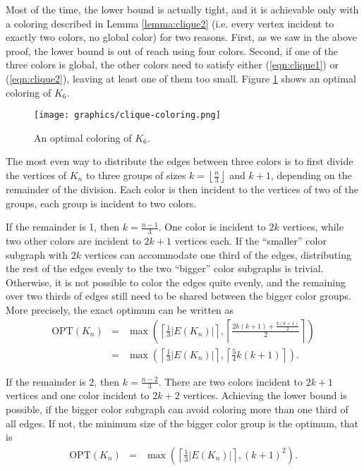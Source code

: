 \documentclass[runningheads, a4paper]{llncs}
\begin{document}
Most of the time, the lower bound is actually tight, and it is achievable only with a coloring described in Lemma \ref{lemma:clique2} (i.e. every vertex incident to exactly two colors, no global color) for two reasons. First, as we saw in the above proof, the lower bound is out of reach using four colors. Second, if one of the three colors is global, the other colors need to satisfy either (\ref{eqn:clique1}) or (\ref{eqn:clique2}), leaving at least one of them too small. Figure \ref{img:clique-coloring} shows an optimal coloring of $K_6$.

\begin{figure}[htb]
\centering \texttt{[image: graphics/clique-coloring.png]}
\caption{An optimal coloring of $K_6$.}\label{img:clique-coloring}
\end{figure}

The most even way to distribute the edges between three colors is to first divide the vertices of $K_n$ to three groups of sizes $k = \left\lfloor \frac{n}{3} \right\rfloor$ and $k + 1$, depending on the remainder of the division. Each color is then incident to the vertices of two of the groups, each group is incident to two colors.

If the remainder is 1, then $k = \frac{n-1}{3}$. One color is incident to $2k$ vertices, while two other colors are incident to $2k + 1$ vertices each. If the ``smaller'' color subgraph with $2k$ vertices can accommodate one third of the edges, distributing the rest of the edges evenly to the two ``bigger'' color subgraphs is trivial. Otherwise, it is not possible to color the edges quite evenly, and the remaining over two thirds of edges still need to be shared between the bigger color groups. More precisely, the exact optimum can be written as
\begin{eqnarray}\nonumber
\textrm{OPT}(K_n) & = & \max \left( \left\lceil \frac{1}{3} |E(K_n)| \right\rceil, \left\lceil \frac{2 k(k+1) + \frac{k(k+1)}{2}}{2} \right\rceil \right) \\ \nonumber
& = & \max \left( \left\lceil \frac{1}{3} |E(K_n)| \right\rceil, \left\lceil \frac{5}{4}k(k+1) \right\rceil \right).
\end{eqnarray}

If the remainder is 2, then $k = \frac{n-2}{3}$. There are two colors incident to $2k + 1$ vertices and one color incident to $2k + 2$ vertices. Achieving the lower bound is possible, if the bigger color subgraph can avoid coloring more than one third of all edges. If not, the minimum size of the bigger color group is the optimum, that is
\begin{eqnarray}\nonumber
\textrm{OPT}(K_n) & = & \max \left( \left\lceil \frac{1}{3} |E(K_n)| \right\rceil, (k+1)^2 \right).
\end{eqnarray}
\end{document}
